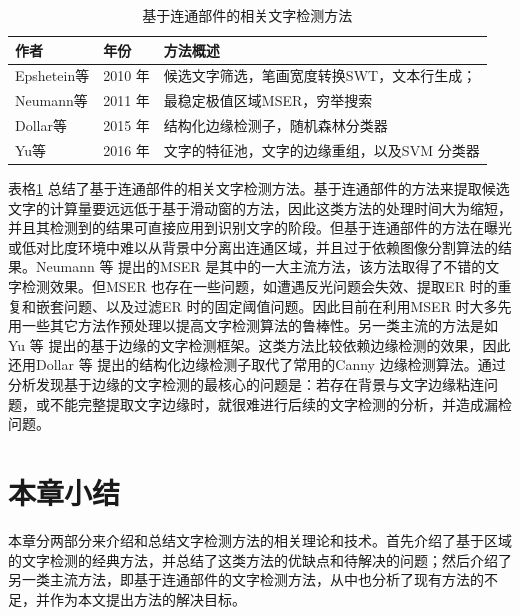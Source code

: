    \begin{table}[!h]
    \centering
    \caption{基于连通部件的相关文字检测方法}
    \begin{tabular}{p{} p{} p{}}
    \toprule
    作者 & 年份 & 方法概述 \\
    \midrule
    Epshetein等\cite{Epshtein2010Detecting} & 2010 年 & 候选文字筛选，笔画宽度转换SWT，文本行生成；\\
    Neumann等\cite{Neumann2011Text} & 2011 年 &   最稳定极值区域MSER，穷举搜索\\
    Dollar等\cite{Dollar2015Fast} & 2015 年 & 结构化边缘检测子，随机森林分类器 \\
    Yu等\cite{Yu2016Scene} & 2016 年 & 文字的特征池，文字的边缘重组，以及SVM 分类器 \\
    \bottomrule
    \end{tabular}
    \label{tab.c2_connected_component_based}
    \end{table}

    表格\ref{tab.c2_connected_component_based} 总结了基于连通部件的相关文字检测方法。基于连通部件的方法来提取候选文字的计算量要远远低于基于滑动窗的方法，因此这类方法的处理时间大为缩短，并且其检测到的结果可直接应用到识别文字的阶段。但基于连通部件的方法在曝光或低对比度环境中难以从背景中分离出连通区域，并且过于依赖图像分割算法的结果。Neumann 等\cite{Neumann2010A,Neumann2011Text,Neumann2012Real} 提出的MSER 是其中的一大主流方法，该方法取得了不错的文字检测效果。但MSER 也存在一些问题，如遭遇反光问题会失效、提取ER 时的重复和嵌套问题、以及过滤ER 时的固定阈值问题。因此目前在利用MSER 时大多先用一些其它方法作预处理以提高文字检测算法的鲁棒性。另一类主流的方法是如Yu 等\cite{Yu2016Scene} 提出的基于边缘的文字检测框架。这类方法比较依赖边缘检测的效果，因此还用Dollar 等\cite{Dollar2015Fast} 提出的结构化边缘检测子取代了常用的Canny 边缘检测算法。通过分析发现基于边缘的文字检测的最核心的问题是：若存在背景与文字边缘粘连问题，或不能完整提取文字边缘时，就很难进行后续的文字检测的分析，并造成漏检问题。

    \section{本章小结}

    本章分两部分来介绍和总结文字检测方法的相关理论和技术。首先介绍了基于区域的文字检测的经典方法，并总结了这类方法的优缺点和待解决的问题；然后介绍了另一类主流方法，即基于连通部件的文字检测方法，从中也分析了现有方法的不足，并作为本文提出方法的解决目标。

